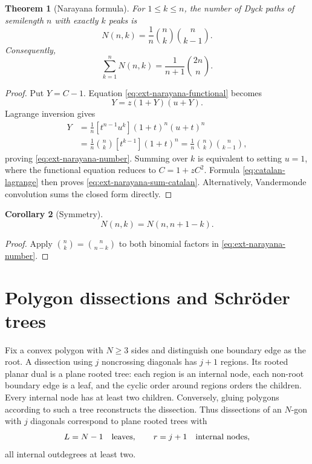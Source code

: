 \documentclass[11pt,a4paper,oneside,openany]{book}
\newtheorem{theorem}{Theorem}[chapter]
\newtheorem{corollary}[theorem]{Corollary}
\theoremstyle{definition}
\theoremstyle{remark}
\begin{document}
\begin{theorem}[Narayana formula]
For \(1\le k\le n\), the number of Dyck paths of semilength \(n\) with exactly
\(k\) peaks is
\begin{equation}\label{eq:ext-narayana-number}
 N(n,k)=\frac1n\binom nk\binom n{k-1}.
\end{equation}
Consequently,
\begin{equation}\label{eq:ext-narayana-sum-catalan}
 \sum_{k=1}^nN(n,k)=\frac1{n+1}\binom{2n}{n}.
\end{equation}
\end{theorem}
\begin{proof}
Put \(Y=C-1\).  Equation \eqref{eq:ext-narayana-functional} becomes
\[
 Y=z(1+Y)(u+Y).
\]
Lagrange inversion gives
\begin{align*}
 [z^nu^k]Y
 &=\frac1n[t^{n-1}u^k](1+t)^n(u+t)^n\\
 &=\frac1n\binom nk[t^{k-1}](1+t)^n
 =\frac1n\binom nk\binom n{k-1},
\end{align*}
proving \eqref{eq:ext-narayana-number}.  Summing over \(k\) is equivalent to
setting \(u=1\), where the functional equation reduces to
\(C=1+zC^2\).  Formula \eqref{eq:catalan-lagrange} then proves
\eqref{eq:ext-narayana-sum-catalan}.  Alternatively, Vandermonde convolution
sums the closed form directly.
\end{proof}

\begin{corollary}[Symmetry]
\begin{equation}\label{eq:ext-narayana-symmetry}
 N(n,k)=N(n,n+1-k).
\end{equation}
\end{corollary}
\begin{proof}
Apply \(\binom nk=\binom n{n-k}\) to both binomial factors in
\eqref{eq:ext-narayana-number}.
\end{proof}

\section{Polygon dissections and Schr\"oder trees}

Fix a convex polygon with \(N\ge3\) sides and distinguish one boundary edge as
the root.  A dissection using \(j\) noncrossing diagonals has \(j+1\) regions.
Its rooted planar dual is a plane rooted tree: each region is an internal node,
each non-root boundary edge is a leaf, and the cyclic order around regions
orders the children.  Every internal node has at least two children.  Conversely,
gluing polygons according to such a tree reconstructs the dissection.  Thus
dissections of an \(N\)-gon with \(j\) diagonals correspond to plane rooted
trees with
\begin{equation}\label{eq:ext-dissection-tree-parameters}
 L=N-1\quad\hbox{leaves},\qquad r=j+1\quad\hbox{internal nodes},
\end{equation}
all internal outdegrees at least two.
\end{document}
